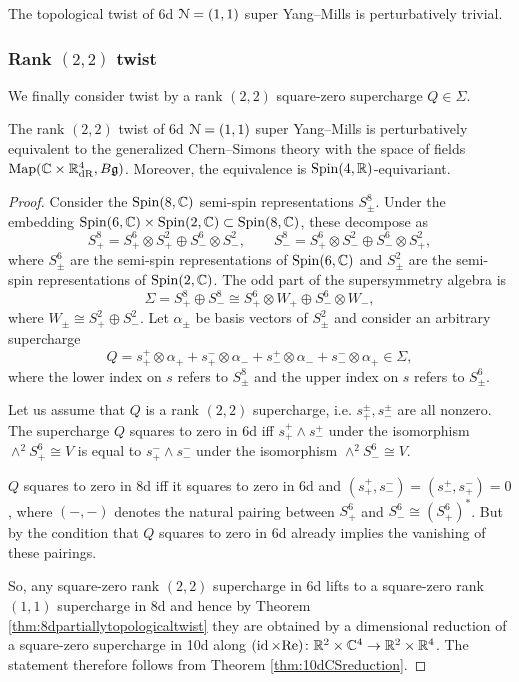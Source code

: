 \documentclass[10pt, oneside]{article}
\renewcommand{\Re}{\mathrm{Re}}
\begin{document}
\begin{cor}
The topological twist of 6d $\mathcal N=(1, 1)$ super Yang--Mills is perturbatively trivial.
\end{cor}

\subsubsection{Rank $(2, 2)$ twist}

We finally consider twist by a rank $(2, 2)$ square-zero supercharge $Q\in\Sigma$.

\begin{thm}
The rank $(2, 2)$ twist of 6d $\mathcal N=(1, 1)$ super Yang--Mills is perturbatively equivalent to the generalized Chern--Simons theory with the space of fields $\operatorname{Map}(\mathbb C\times \mathbb R^4_{\mathrm{dR}}, B\mathfrak g)$. Moreover, the equivalence is $\mathrm{Spin}(4, \mathbb R)$-equivariant.
\label{thm:6drank22}
\end{thm}
\begin{proof}
Consider the $\mathrm{Spin}(8, \mathbb C)$ semi-spin representations $S^8_\pm$. Under the embedding $\mathrm{Spin}(6, \mathbb C)\times \mathrm{Spin}(2, \mathbb C)\subset \mathrm{Spin}(8, \mathbb C)$, these decompose as
\[S^8_+ = S^6_+\otimes S^2_+\oplus S^6_-\otimes S^2_-,\qquad S^8_- = S^6_+\otimes S^2_-\oplus S^6_-\otimes S^2_+,\]
where $S^6_{\pm}$ are the semi-spin representations of $\mathrm{Spin}(6, \mathbb C)$ and $S^2_{\pm}$ are the semi-spin representations of $\mathrm{Spin}(2, \mathbb C)$. The odd part of the supersymmetry algebra is
\[\Sigma = S^8_+\oplus S^8_-\cong S^6_+\otimes W_+\oplus S^6_-\otimes W_-,\]
where $W_{\pm}\cong S^2_+\oplus S^2_-$. Let $\alpha_\pm$ be basis vectors of $S^2_{\pm}$ and consider an arbitrary supercharge
\[Q = s_+^+\otimes \alpha_+ + s_+^-\otimes \alpha_- + s_-^+\otimes \alpha_- + s_-^-\otimes \alpha_+\in\Sigma,\]
where the lower index on $s$ refers to $S^8_\pm$ and the upper index on $s$ refers to $S^6_\pm$.

Let us assume that $Q$ is a rank $(2, 2)$ supercharge, i.e. $s_+^\pm, s_-^\pm$ are all nonzero. The supercharge $Q$ squares to zero in 6d iff $s_+^+\wedge s_-^+$ under the isomorphism $\wedge^2 S^6_+\cong V$ is equal to $s_+^-\wedge s_-^-$ under the isomorphism $\wedge^2 S^6_-\cong V$.

$Q$ squares to zero in 8d iff it squares to zero in 6d and $(s_+^+, s_-^-) = (s_-^+, s_+^-) = 0$, where $(-, -)$ denotes the natural pairing between $S^6_+$ and $S^6_-\cong (S^6_+)^*$. But by \cite[Lemma 4.42]{ElliottSafronov} the condition that $Q$ squares to zero in 6d already implies the vanishing of these pairings.

So, any square-zero rank $(2, 2)$ supercharge in 6d lifts to a square-zero rank $(1, 1)$ supercharge in 8d and hence by Theorem \ref{thm:8dpartiallytopologicaltwist} they are obtained by a dimensional reduction of a square-zero supercharge in 10d along $(\id\times \Re)\colon \RR^2\times \CC^4\rightarrow \RR^2\times \RR^4$. The statement therefore follows from Theorem \ref{thm:10dCSreduction}.
\end{proof}
\end{document}
